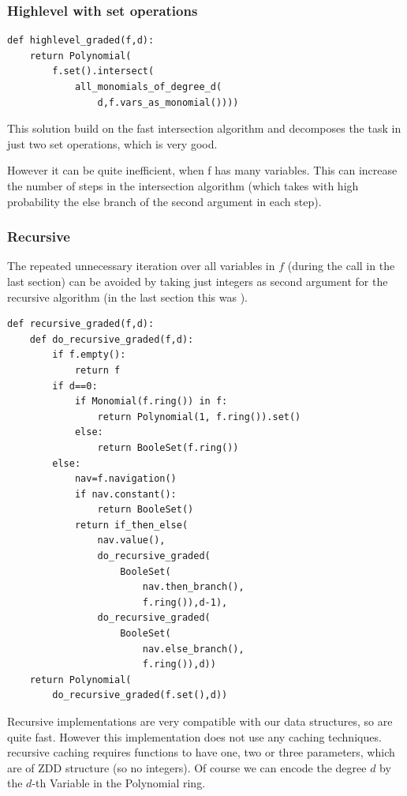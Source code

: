 \subsubsection{Highlevel with set operations}
\begin{lstlisting}
def highlevel_graded(f,d):
    return Polynomial(
        f.set().intersect(
            all_monomials_of_degree_d(
                d,f.vars_as_monomial())))
\end{lstlisting}
This solution build on the fast intersection algorithm and decomposes the task in just two set operations, which is very good.

However it can be quite inefficient, when f has many variables.
This can increase the number of steps in the intersection algorithm (which takes with high probability the else branch of the second argument in each step).

\subsubsection{Recursive}
The repeated unnecessary iteration over all variables in $f$ (during the  call in the last section) can be avoided by taking just integers as second argument for the recursive algorithm (in the last section this was ).

\begin{lstlisting}
def recursive_graded(f,d):
    def do_recursive_graded(f,d):
        if f.empty():
            return f
        if d==0:
            if Monomial(f.ring()) in f:
                return Polynomial(1, f.ring()).set()
            else:
                return BooleSet(f.ring())
        else:
            nav=f.navigation()
            if nav.constant():
                return BooleSet()
            return if_then_else(
                nav.value(),
                do_recursive_graded(
                    BooleSet(
                        nav.then_branch(),
                        f.ring()),d-1),
                do_recursive_graded(
                    BooleSet(
                        nav.else_branch(),
                        f.ring()),d))
    return Polynomial(
        do_recursive_graded(f.set(),d))
\end{lstlisting}
Recursive implementations are very compatible with our data structures, so are quite fast. However this implementation does not use any caching techniques. \CUDD recursive caching requires functions to have one, two or three parameters, which are of ZDD structure (so no integers).
Of course we can encode the degree $d$ by the $d$-th Variable in the Polynomial
ring.

